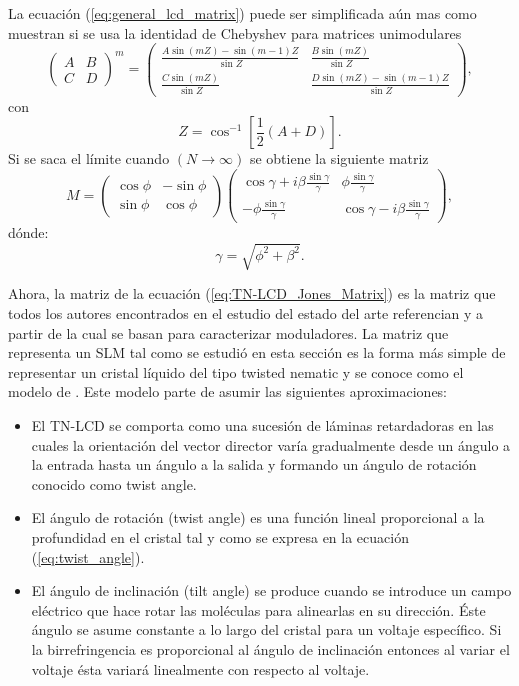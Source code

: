 La ecuación (\ref{eq:general_lcd_matrix}) puede ser simplificada aún
mas como muestran  si se usa la identidad de Chebyshev
para matrices unimodulares  
\begin{equation}
  \begin{pmatrix}
    A & B \\ C & D
  \end{pmatrix}^m
=
\begin{pmatrix}
  \frac{A\sin{ (mZ) }-\sin(m-1)Z }{\sin{Z} }
  &\frac{B\sin{(mZ)}}{\sin{Z}}\\
\frac{C\sin{(mZ)}}{\sin{Z}}&   \frac{D\sin{ (mZ) }-\sin(m-1)Z }{\sin{Z} }
\end{pmatrix},
  \label{eq:chebyshev}
\end{equation}
con \[Z = \cos^{-1}{\left[\frac{1}{2}(A+D)\right]}.\]
Si se saca el límite cuando $(N\rightarrow \infty)$ se obtiene la
siguiente matriz
\begin{equation}
  \label{eq:TN-LCD_Jones_Matrix}
  M=
  \begin{pmatrix}
    \cos{\phi} & -\sin{\phi}\\\sin{\phi}&\cos{\phi}
  \end{pmatrix}
  \begin{pmatrix}
    \cos{\gamma}+i\beta\frac{\sin{\gamma}}{\gamma} & \phi\frac{\sin{\gamma}}{\gamma}\\
-\phi\frac{\sin{\gamma}}{\gamma}   & \cos{\gamma}-i\beta\frac{\sin{\gamma}}{\gamma}
  \end{pmatrix},
\end{equation} 
dónde:
\[\gamma=\sqrt{\phi^2+\beta^2}.\]

Ahora, la matriz de la ecuación (\ref{eq:TN-LCD_Jones_Matrix})  es la
matriz que todos los autores encontrados en el
estudio del estado del arte referencian y a partir de la cual se basan
para caracterizar moduladores. La matriz que representa un
SLM  tal como se estudió en esta sección es la forma más
simple de representar un cristal líquido del tipo twisted nematic y se
conoce como el modelo de . Este modelo
parte de asumir las siguientes aproximaciones:

\begin{itemize}
\item El TN-LCD se comporta como una sucesión de  láminas
  retardadoras en las cuales la orientación del vector director varía
  gradualmente desde un ángulo a la entrada hasta un ángulo a la
  salida y formando un ángulo de rotación conocido como twist angle. 
\item El ángulo de rotación (twist angle) es una función lineal
  proporcional a la profundidad en el cristal tal y como se expresa en
  la ecuación (\ref{eq:twist_angle}).
\item El ángulo de inclinación (tilt angle) se produce cuando se
  introduce un campo eléctrico que hace rotar las moléculas para
  alinearlas en su dirección. Éste ángulo se asume constante a lo
  largo del cristal para un voltaje específico. Si la birrefringencia
  es proporcional al ángulo de inclinación entonces al variar el
  voltaje ésta variará linealmente con respecto al voltaje.
\end{itemize}

